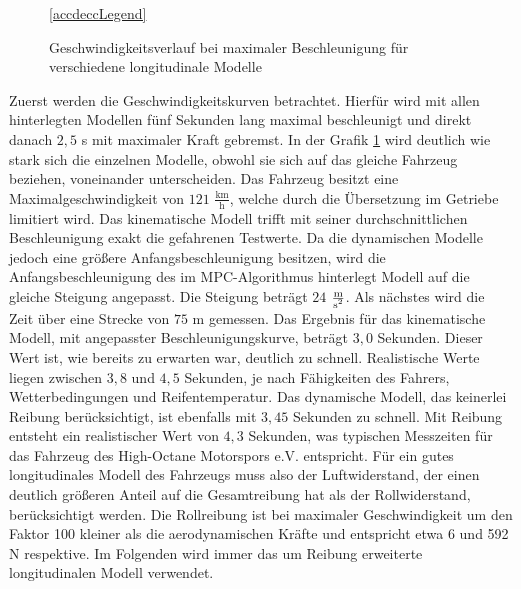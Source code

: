 \documentclass{like}
\begin{document}
\begin{figure}
	\centering
	 
	\ref{accdeccLegend}
	\caption{Geschwindigkeitsverlauf bei maximaler Beschleunigung für verschiedene longitudinale Modelle}
	\label{fig:accdec}
\end{figure}
Zuerst werden die Geschwindigkeitskurven betrachtet. Hierfür wird mit allen hinterlegten Modellen fünf Sekunden lang maximal beschleunigt und direkt danach $2,5$ s mit maximaler Kraft gebremst.
In der Grafik \ref{fig:accdec} wird deutlich wie stark sich die einzelnen Modelle, obwohl sie sich auf das gleiche Fahrzeug beziehen, voneinander unterscheiden. Das Fahrzeug besitzt eine Maximalgeschwindigkeit von $121$  $\frac{\text{km}}{\text{h}}$, welche durch die Übersetzung im Getriebe limitiert wird. Das kinematische Modell trifft mit seiner durchschnittlichen Beschleunigung exakt die gefahrenen Testwerte. Da die dynamischen Modelle jedoch eine größere Anfangsbeschleunigung besitzen, wird die Anfangsbeschleunigung des im \ac{MPC}-Algorithmus hinterlegt Modell auf die gleiche Steigung angepasst. Die Steigung beträgt $24$ $ \frac{\text{m}}{\text{s\textsuperscript{2}}}$. 
Als nächstes wird die Zeit über eine Strecke von $75$ m gemessen. Das Ergebnis für das kinematische Modell, mit angepasster Beschleunigungskurve, beträgt $3,0$ Sekunden. Dieser Wert ist, wie bereits zu erwarten war, deutlich zu schnell. Realistische Werte liegen zwischen $3,8$ und $4,5$ Sekunden, je nach Fähigkeiten des Fahrers, Wetterbedingungen und Reifentemperatur. Das dynamische Modell, das keinerlei Reibung berücksichtigt, ist ebenfalls mit $3,45$ Sekunden zu schnell. Mit Reibung entsteht ein realistischer Wert von $4,3$ Sekunden, was typischen Messzeiten für das Fahrzeug des High-Octane Motorspors e.V. entspricht. Für ein gutes longitudinales Modell des Fahrzeugs muss also der Luftwiderstand, der einen deutlich größeren Anteil auf die Gesamtreibung hat als der Rollwiderstand, berücksichtigt werden. Die Rollreibung ist bei maximaler Geschwindigkeit um den Faktor 100 kleiner als die aerodynamischen Kräfte und entspricht etwa 6 und 592 N respektive. Im Folgenden wird immer das um Reibung erweiterte longitudinalen Modell verwendet.
\end{document}
